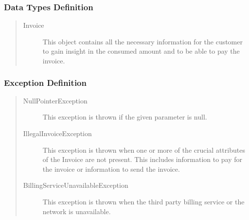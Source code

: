 \subsubsection{Data Types Definition}

\begin{quote}
	\begin{description}
		\item[Invoice] This object contains all the necessary information for the
		customer to gain insight in the consumed amount and to be able to pay the
		invoice. 
	\end{description} 
\end{quote}

\subsubsection{Exception Definition}

\begin{quote}
	\begin{description}
		\item[NullPointerException] This exception is thrown if the given parameter is
		null.
		\item[IllegalInvoiceException] This exception is thrown when one or more of
		the crucial attributes of the Invoice are not present. This includes
		information to pay for the invoice or information to send the invoice.
		\item[BillingServiceUnavailableException] This exception is thrown when the
		third party billing service or the network is unavailable.
	\end{description} 
\end{quote}
